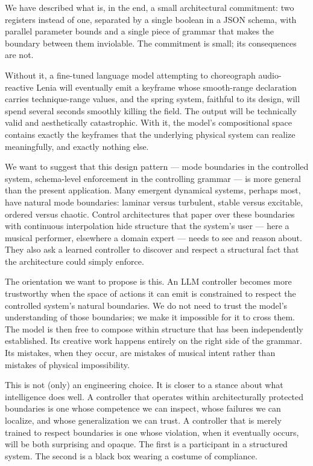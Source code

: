 \documentclass[11pt]{article}
\begin{document}
We have described what is, in the end, a small architectural commitment:
two registers instead of one, separated by a single boolean in a JSON
schema, with parallel parameter bounds and a single piece of grammar that
makes the boundary between them inviolable. The commitment is small; its
consequences are not.

Without it, a fine-tuned language model attempting to choreograph
audio-reactive Lenia will eventually emit a keyframe whose smooth-range
declaration carries technique-range values, and the spring system, faithful
to its design, will spend several seconds smoothly killing the field. The
output will be technically valid and aesthetically catastrophic. With it,
the model's compositional space contains exactly the keyframes that the
underlying physical system can realize meaningfully, and exactly nothing
else.

We want to suggest that this design pattern --- mode boundaries in the
controlled system, schema-level enforcement in the controlling grammar ---
is more general than the present application. Many emergent dynamical
systems, perhaps most, have natural mode boundaries: laminar versus
turbulent, stable versus excitable, ordered versus chaotic. Control
architectures that paper over these boundaries with continuous interpolation
hide structure that the system's user --- here a musical performer,
elsewhere a domain expert --- needs to see and reason about. They also
ask a learned controller to discover and respect a structural fact that
the architecture could simply enforce.

The orientation we want to propose is this. An LLM controller becomes more
trustworthy when the space of actions it can emit is constrained to respect
the controlled system's natural boundaries. We do not need to trust the
model's understanding of those boundaries; we make it impossible for it to
cross them. The model is then free to compose within structure that has
been independently established. Its creative work happens entirely on the
right side of the grammar. Its mistakes, when they occur, are mistakes of
musical intent rather than mistakes of physical impossibility.

This is not (only) an engineering choice. It is closer to a stance about
what intelligence does well. A controller that operates within
architecturally protected boundaries is one whose competence we can
inspect, whose failures we can localize, and whose generalization we can
trust. A controller that is merely trained to respect boundaries is one
whose violation, when it eventually occurs, will be both surprising and
opaque. The first is a participant in a structured system. The second is a
black box wearing a costume of compliance.
\end{document}
